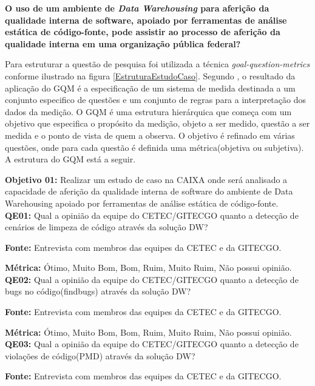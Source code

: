 \textbf{O uso de um ambiente de \textit{Data Warehousing} para aferição da qualidade interna de software, apoiado por ferramentas de análise estática de código-fonte,  pode assistir ao processo de aferição da qualidade interna em uma organização pública federal?}

Para estruturar a questão de pesquisa foi utilizada a técnica \textit{goal-question-metrics} conforme ilustrado na figura \ref{EstruturaEstudoCaso}. Segundo \cite{Basili96b}, o resultado da aplicação do GQM é a especificação de um sistema de medida destinada a um conjunto especifico de questões e um conjunto de regras para a interpretação dos dados da medição. O GQM é uma estrutura hierárquica que começa com um objetivo que especifica o propósito da medição, objeto a ser medido, questão a ser medida e o ponto de vista de quem a observa. O objetivo é refinado em várias questões, onde para cada questão é definida uma métrica(objetiva ou subjetiva)\cite{Basili96b}. A estrutura do GQM está a seguir.

\textbf{Objetivo 01:} Realizar um estudo de caso na CAIXA onde será analisado a capacidade de aferição da qualidade interna de software do ambiente de Data Warehousing apoiado por ferramentas de análise estática de código-fonte.\\



\textbf{QE01:} Qual a opinião da equipe do CETEC/GITECGO quanto a detecção de cenários de limpeza de código através da solução DW?

\textbf{Fonte:} Entrevista com membros das equipes da CETEC e da GITECGO.

\textbf{Métrica:} Ótimo, Muito Bom, Bom, Ruim, Muito Ruim, Não possui opinião. \\



\textbf{QE02: } Qual a opinião da equipe do CETEC/GITECGO quanto a detecção de bugs no código(findbugs) através da solução DW?

\textbf{Fonte:} Entrevista com membros das equipes da CETEC e da GITECGO.

\textbf{Métrica:} Ótimo, Muito Bom, Bom, Ruim, Muito Ruim, Não possui opinião.\\



\textbf{QE03: } Qual a opinião da equipe do CETEC/GITECGO quanto a detecção de violações de código(PMD) através da solução DW?

\textbf{Fonte:} Entrevista com membros das equipes da CETEC e da GITECGO.

